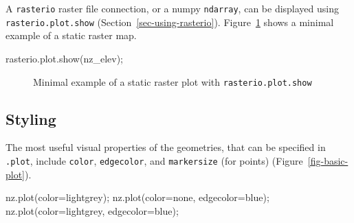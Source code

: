 \documentclass[
  letterpaper,
]{krantz}
\newenvironment{Shaded}{\begin{snugshade}}{\end{snugshade}}
\newcommand{\NormalTok}[1]{\textcolor[rgb]{0.00,0.23,0.31}{#1}}
\newcommand{\OperatorTok}[1]{\textcolor[rgb]{0.37,0.37,0.37}{#1}}
\newcommand{\StringTok}[1]{\textcolor[rgb]{0.13,0.47,0.30}{#1}}
\begin{document}
A \texttt{rasterio} raster file connection, or a numpy \texttt{ndarray},
can be displayed using \texttt{rasterio.plot.show}
(Section~\ref{sec-using-rasterio}). Figure~\ref{fig-raster-minimal}
shows a minimal example of a static raster map.

\begin{Shaded}
\begin{Highlighting}[]
\NormalTok{rasterio.plot.show(nz\_elev)}\OperatorTok{;}
\end{Highlighting}
\end{Shaded}

\begin{figure}[H]


\caption{\label{fig-raster-minimal}Minimal example of a static raster
plot with \texttt{rasterio.plot.show}}

\end{figure}%

\subsection{Styling}\label{sec-static-styling}

The most useful visual properties of the geometries, that can be
specified in \texttt{.plot}, include \texttt{color}, \texttt{edgecolor},
and \texttt{markersize} (for points) (Figure~\ref{fig-basic-plot}).

\begin{Shaded}
\begin{Highlighting}[]
\NormalTok{nz.plot(color}\OperatorTok{=}\StringTok{\textquotesingle{}lightgrey\textquotesingle{}}\NormalTok{)}\OperatorTok{;}
\NormalTok{nz.plot(color}\OperatorTok{=}\StringTok{\textquotesingle{}none\textquotesingle{}}\NormalTok{, edgecolor}\OperatorTok{=}\StringTok{\textquotesingle{}blue\textquotesingle{}}\NormalTok{)}\OperatorTok{;}
\NormalTok{nz.plot(color}\OperatorTok{=}\StringTok{\textquotesingle{}lightgrey\textquotesingle{}}\NormalTok{, edgecolor}\OperatorTok{=}\StringTok{\textquotesingle{}blue\textquotesingle{}}\NormalTok{)}\OperatorTok{;}
\end{Highlighting}
\end{Shaded}
\end{document}
